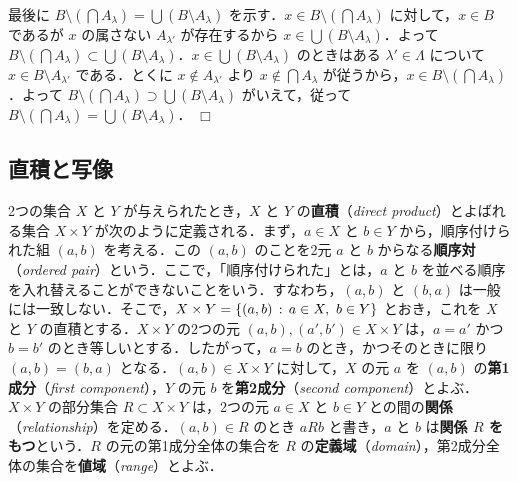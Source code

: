 \documentclass[pandoc,base=10pt,b5j,precisetext]{bxjsarticle}
\begin{document}
最後に
\(B \setminus \left( \bigcap A_\lambda \right) = \bigcup ( B \setminus A_\lambda )\)
を示す．\(x \in B \setminus \left( \bigcap A_\lambda \right)\)
に対して，\(x \in B\) であるが \(x\) の属さない \(A_{\lambda'}\)
が存在するから \(x \in \bigcup ( B \setminus A_\lambda )\)．よって
\(B \setminus \left( \bigcap A_\lambda \right) \subset \bigcup ( B \setminus A_\lambda )\)．\(x \in \bigcup ( B \setminus A_\lambda )\)
のときはある \(\lambda' \in \Lambda\) について
\(x \in B \setminus A_{\lambda'}\) である．とくに
\(x \notin A_{\lambda'}\) より \(x \notin \bigcap A_\lambda\)
が従うから，\(x \in B \setminus \left( \bigcap A_\lambda \right)\)．よって
\(B \setminus \left( \bigcap A_\lambda \right) \supset \bigcup ( B \setminus A_\lambda )\)
がいえて，従って
\(B \setminus \left( \bigcap A_\lambda \right) = \bigcup ( B \setminus A_\lambda )\)．
\(\Box\)

\hypertarget{ux76f4ux7a4dux3068ux5199ux50cf}{%
\subsection{直積と写像}\label{ux76f4ux7a4dux3068ux5199ux50cf}}

2つの集合 \(X\) と \(Y\) が与えられたとき，\(X\) と \(Y\)
の\textbf{直積}（\emph{direct product}）とよばれる集合 \(X \times Y\)
が次のように定義される．まず，\(a \in X\) と \(b \in Y\)
から，順序付けられた組 \((a,b)\) を考える．この \((a,b)\) のことを2元
\(a\) と \(b\) からなる\textbf{順序対}（\emph{ordered
pair}）という．ここで，「順序付けられた」とは，\(a\) と \(b\)
を並べる順序を入れ替えることができないことをいう．すなわち，\((a,b)\) と
\((b,a)\)
は一般には一致しない．そこで，\(X \times Y = \{ (a,b) \,:\, a \in X,\ b \in Y \}\)
とおき，これを \(X\) と \(Y\) の直積とする．\(X \times Y\) の2つの元
\((a,b), (a',b') \in X \times Y\) は，\(a = a'\) かつ \(b = b'\)
のとき等しいとする．したがって，\(a = b\) のとき，かつそのときに限り
\((a,b) = (b,a)\) となる．\((a,b) \in X \times Y\) に対して，\(X\) の元
\(a\) を \((a,b)\) の\textbf{第1成分}（\emph{first component}），\(Y\)
の元 \(b\) を\textbf{第2成分}（\emph{second component}）とよぶ．
\(X \times Y\) の部分集合 \(R \subset X \times Y\) は，2つの元
\(a \in X\) と \(b \in Y\)
との間の\textbf{関係}（\emph{relationship}）を定める．\((a,b) \in R\)
のとき \(aRb\) と書き，\(a\) と \(b\) は\textbf{関係 \(R\)
をもつ}という．\(R\) の元の第1成分全体の集合を \(R\)
の\textbf{定義域}（\emph{domain}），第2成分全体の集合を\textbf{値域}（\emph{range}）とよぶ．
\end{document}
